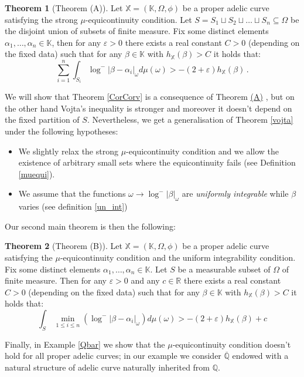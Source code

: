 \documentclass[10 pt,a4paper]{article}
\theoremstyle{plain}
\theoremstyle{definition}
\theoremstyle{named}
\newtheorem*{namedtheorem}{Theorem}
\newcommand\bref[3][blue]{%
    \begingroup%
    \hypersetup{linkcolor=#1}%
    \hyperlink{#2}{#3}%
    \endgroup}
\begin{document}
\begin{namedtheorem}[\hypertarget{thm:(A)}{Theorem (A)}]
Let $\mathbb X=(\mathbb K,\Omega, \phi)$ be a proper adelic curve satisfying the strong $\mu$-equicontinuity condition. Let $S=S_1\sqcup S_2\sqcup\ldots\sqcup S_n\subseteq\Omega $ be the disjoint union of subsets of finite measure. Fix some distinct elements $\alpha_1,\dots ,\alpha_n\in\mathbb K$, then for any $\varepsilon>0$ there exists a real constant $C>0$ (depending on the fixed data) such that for any $\beta\in \mathbb K$ with $h_{\mathbb X}(\beta)>C$ 
it holds that:
\begin{equation}\label{our_roth}
\sum^n_{i=1}\int_{S_i}\log^-\vert \beta-\alpha_i\vert_\omega d\mu(\omega)>-(2+\varepsilon)h_\mathbb X(\beta)\,.
\end{equation}
\end{namedtheorem}
We will show that Theorem \ref{CorCorv} is a consequence of Theorem \bref{thm:main}{(A)}, but on the other hand Vojta's inequality is stronger and moreover it doesn't depend on the fixed partition of $S$. Nevertheless, we get a generalisation of Theorem \ref{vojta}  under the following hypotheses:
\begin{itemize}
\item We slightly relax the  strong $\mu$-equicontinuity condition and we allow the existence of arbitrary small sets where the equicontinuity fails (see Definition \ref{muequi}).
\item   We assume that  the functions $\omega\to \log^-|\beta|_\omega$ are \emph{uniformly integrable} while $\beta$ varies (see definition \ref{un_int})
\end{itemize}

Our second main theorem is then the following:

\begin{namedtheorem}[\hypertarget{thm:(B)}{Theorem (B)}]
Let $\mathbb X=(\mathbb K,\Omega, \phi)$ be a proper adelic curve satisfying the $\mu$-equicontinuity condition and the uniform integrability condition. Fix some distinct elements $\alpha_1,\dots ,\alpha_n\in\mathbb K$. Let $S$ be a measurable  subset of $\Omega$ of finite measure. Then for any $\varepsilon>0$ and any $c\in\mathbb R$ there exists a real constant $C>0$ (depending on the fixed data) such that for any $\beta\in \mathbb K$  with  $h_{\mathbb X}(\beta)>C$   
it holds that:
\begin{equation}\label{our_roth_encore}
\int_{S}\,\min_{1\le i\le n}\left(\log^-\vert \beta-\alpha_i\vert_\omega\right) d\mu(\omega)>-(2+\varepsilon)h_\mathbb X(\beta)+c
\end{equation}
\end{namedtheorem}
Finally, in  Example \ref{Qbar} we show that  the $\mu$-equicontinuity condition doesn't hold for all proper adelic curves; in our example we consider $\overline{\mathbb Q}$ endowed with a natural structure of adelic curve naturally inherited from $\mathbb Q$.
\end{document}
